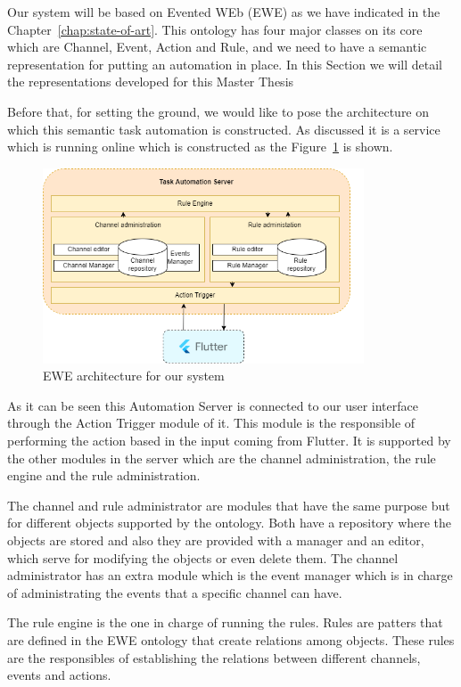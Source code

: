 Our system will be based on Evented WEb (EWE) as we have indicated in the Chapter~\ref{chap:state-of-art}. This ontology has four major classes on its core which are Channel, Event, Action and Rule, and we need to have a semantic representation for putting an automation in place. In this Section we will detail the representations developed for this Master Thesis

Before that, for setting the ground, we would like to pose the architecture on which this semantic task automation is constructed. As discussed it is a service which is running online which is constructed as the Figure~\ref{fig:ewearchitecure} is shown.

\begin{figure}[h]
    \centering
    \includegraphics[width=0.85\textwidth]{img/architecture/EWEarchitecture.png}
    \caption{EWE architecture for our system}
    \label{fig:ewearchitecure}
\end{figure}

As it can be seen this Automation Server is connected to our user interface through the Action Trigger module of it. This module is the responsible of performing the action based in the input coming from Flutter. It is supported by the other modules in the server which are the channel administration, the rule engine and the rule administration.

The channel and rule administrator are modules that have the same purpose but for different objects supported by the ontology. Both have a repository where the objects are stored and also they are provided with a manager and an editor, which serve for modifying the objects or even delete them. The channel administrator has an extra module which is the event manager which is in charge of administrating the events that a specific channel can have.

The rule engine is the one in charge of running the rules. Rules are patters that are defined in the EWE ontology that create relations among objects. These rules are the responsibles of establishing the relations between different channels, events and actions.

